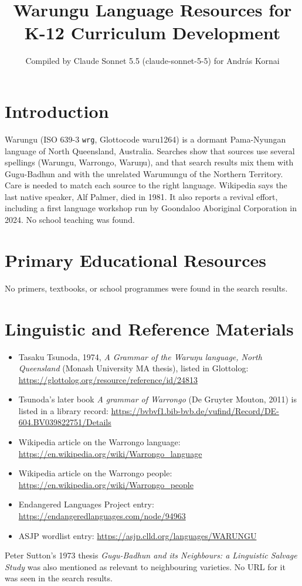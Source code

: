 \documentclass[12pt]{article}
\title{Warungu Language Resources for K-12 Curriculum Development}
\author{Compiled by Claude Sonnet 5.5 (claude-sonnet-5-5) for Andr\'as Kornai}
\date{}
\begin{document}
\maketitle

\section{Introduction}
Warungu (ISO 639-3 \texttt{wrg}, Glottocode waru1264) is a dormant Pama-Nyungan language of North Queensland, Australia. Searches show that sources use several spellings (Warungu, Warrongo, Waruŋu), and that search results mix them with Gugu-Badhun and with the unrelated Warumungu of the Northern Territory. Care is needed to match each source to the right language. Wikipedia says the last native speaker, Alf Palmer, died in 1981. It also reports a revival effort, including a first language workshop run by Goondaloo Aboriginal Corporation in 2024. No school teaching was found.

\section{Primary Educational Resources}
No primers, textbooks, or school programmes were found in the search results.

\section{Linguistic and Reference Materials}
\begin{itemize}
\item Tasaku Tsunoda, 1974, \emph{A Grammar of the Waruŋu language, North Queensland} (Monash University MA thesis), listed in Glottolog: \url{https://glottolog.org/resource/reference/id/24813}
\item Tsunoda's later book \emph{A grammar of Warrongo} (De Gruyter Mouton, 2011) is listed in a library record: \url{https://bvbvf1.bib-bvb.de/vufind/Record/DE-604.BV039822751/Details}
\item Wikipedia article on the Warrongo language: \url{https://en.wikipedia.org/wiki/Warrongo_language}
\item Wikipedia article on the Warrongo people: \url{https://en.wikipedia.org/wiki/Warrongo_people}
\item Endangered Languages Project entry: \url{https://endangeredlanguages.com/node/94963}
\item ASJP wordlist entry: \url{https://asjp.clld.org/languages/WARUNGU}
\end{itemize}
Peter Sutton's 1973 thesis \emph{Gugu-Badhun and its Neighbours: a Linguistic Salvage Study} was also mentioned as relevant to neighbouring varieties. No URL for it was seen in the search results.
\end{document}
